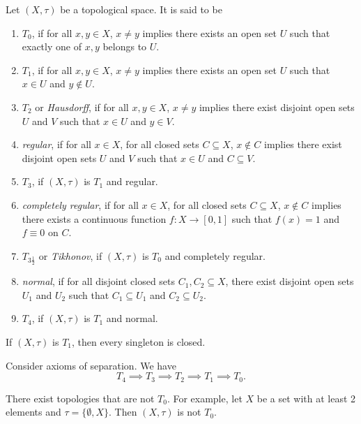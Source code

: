 \documentclass{techreport}
\begin{document}
\begin{definition}\label{De:AxiomsOfSeparation}
	Let $(X,\tau)$ be a topological space.
	It is said to be
	\begin{enumerate}
		\item $T_0$, if for all $x,y \in X$, $x \neq y$ implies there exists an open set $U$ such that exactly one of $x,y$ belongs to $U$.
		\item $T_1$, if for all $x,y \in X$, $x \neq y$ implies there exists an open set $U$ such that $x \in U$ and $y \not\in U$.
		\item $T_2$ or \emph{Hausdorff}, if for all $x,y \in X$, $x \neq y$ implies there exist disjoint open sets $U$ and $V$ such that $x \in U$ and $y \in V$.
		\item \emph{regular}, if for all $x \in X$, for all closed sets $C \subseteq X$, $x \not\in C$ implies there exist disjoint open sets $U$ and $V$ such that $x \in U$ and $C \subseteq V$.
		\item $T_3$, if $(X,\tau)$ is $T_1$ and regular.
		\item \emph{completely regular}, if for all $x \in X$, for all closed sets $C \subseteq X$, $x \not\in C$ implies there exists a continuous function $f : X \to [0,1]$ such that $f(x) = 1$ and $f \equiv 0$ on $C$.
		\item $T_{3\frac{1}{2}}$ or \emph{Tikhonov}, if $(X,\tau)$ is $T_0$ and completely regular.
		\item \emph{normal}, if for all disjoint closed sets $C_1,C_2 \subseteq X$, there exist disjoint open sets $U_1$ and $U_2$ such that $C_1 \subseteq U_1$ and $C_2 \subseteq U_2$.
		\item $T_4$, if $(X,\tau)$ is $T_1$ and normal.
	\end{enumerate}
\end{definition}

\begin{proposition}\label{Prop:T1SingletonClosed}
	If $(X,\tau)$ is $T_1$, then every singleton is closed.
\end{proposition}

\begin{theorem}\label{The:HierarchyOfSeparation}
	Consider axioms of separation.
	We have
	\begin{equation*}
		T_4 \implies T_3 \implies T_2 \implies T_1 \implies T_0.
	\end{equation*}
\end{theorem}

\begin{example}\label{Exa:NotT0}
	There exist topologies that are not $T_0$.
	For example, let $X$ be a set with at least 2 elements and $\tau = \{ \emptyset, X\}$.
	Then $(X,\tau)$ is not $T_0$.
\end{example}
\end{document}
